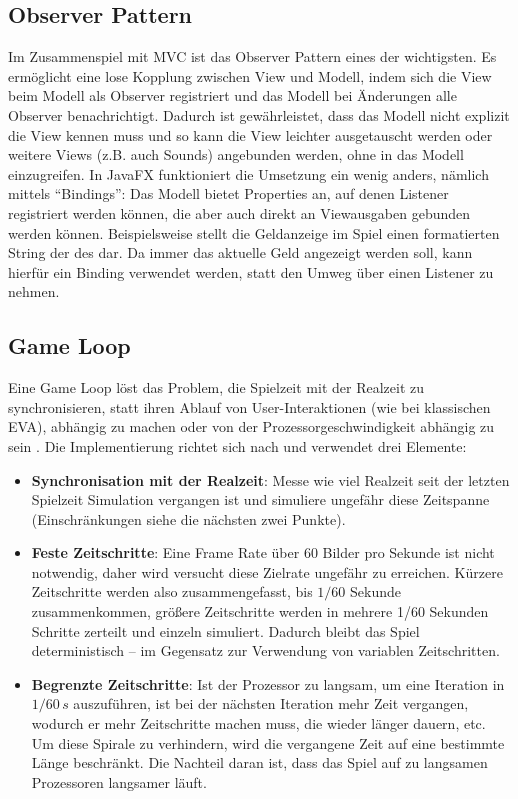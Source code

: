 \subsection{Observer Pattern} %
\label{sub:observer}
Im Zusammenspiel mit MVC ist das Observer Pattern eines der wichtigsten. Es ermöglicht eine lose Kopplung zwischen View und Modell, indem sich die View beim Modell als Observer registriert und das Modell bei Änderungen alle Observer benachrichtigt. Dadurch ist gewährleistet, dass das Modell nicht explizit die View kennen muss und so kann die View leichter ausgetauscht werden oder weitere Views (z.B. auch Sounds) angebunden werden, ohne in das Modell einzugreifen. In JavaFX funktioniert die Umsetzung ein wenig anders, nämlich mittels \enquote{Bindings}: Das Modell bietet Properties an, auf denen Listener registriert werden können, die aber auch direkt an Viewausgaben gebunden werden können. Beispielsweise stellt die Geldanzeige im Spiel einen formatierten String der  des  dar. Da immer das aktuelle Geld angezeigt werden soll, kann hierfür ein Binding verwendet werden, statt den Umweg über einen Listener zu nehmen.

\subsection{Game Loop} %
\label{sub:gameloop}
Eine Game Loop löst das Problem, die Spielzeit mit der Realzeit zu synchronisieren, statt ihren Ablauf von User-Interaktionen (wie bei klassischen EVA), abhängig zu machen oder von der Prozessorgeschwindigkeit abhängig zu sein \cite{gameloopPattern}. Die Implementierung richtet sich nach \cite{gameloopImpl, gameloopImplFX} und verwendet drei Elemente:
\begin{itemize}
	\item \textbf{Synchronisation mit der Realzeit}: Messe wie viel Realzeit seit der letzten Spielzeit Simulation vergangen ist und simuliere ungefähr diese Zeitspanne (Einschränkungen siehe die nächsten zwei Punkte).

	\item \textbf{Feste Zeitschritte}: Eine Frame Rate über 60 Bilder pro Sekunde ist nicht notwendig, daher wird versucht diese Zielrate ungefähr zu erreichen. Kürzere Zeitschritte werden also zusammengefasst, bis \(1/60\) Sekunde zusammenkommen, größere Zeitschritte werden in mehrere 1/60 Sekunden Schritte zerteilt und einzeln simuliert. Dadurch bleibt das Spiel deterministisch -- im Gegensatz zur Verwendung von variablen Zeitschritten.

	\item \textbf{Begrenzte Zeitschritte}: Ist der Prozessor zu langsam, um eine Iteration in \(1/60\,s\) auszuführen, ist bei der nächsten Iteration mehr Zeit vergangen, wodurch er mehr Zeitschritte machen muss, die wieder länger dauern, etc. Um diese Spirale zu verhindern, wird die vergangene Zeit auf eine bestimmte Länge beschränkt. Die Nachteil daran ist, dass das Spiel auf zu langsamen Prozessoren langsamer läuft.
\end{itemize}

